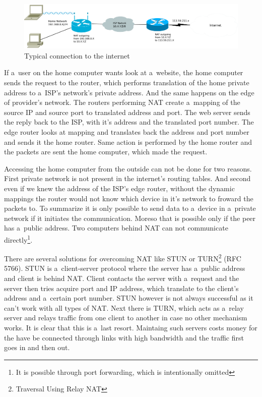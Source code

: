 \begin{figure}[ht]
	\begin{center}
	\includegraphics[width=15cm]{fig/nat-diagram.pdf}
	\caption{Typical connection to the internet}
	\label{fig:nat-diagram}
\end{center}
\end{figure}

If a~user on the home computer wants look at a~website, the home computer sends the request to the router, which performs translation of the home private address to a~ISP's network's private address. And the same happens on the edge of provider's network. The routers performing NAT create a~mapping of the source IP and source port to translated address and port. The web server sends the reply back to the ISP, with it's address and the translated port number. The edge router looks at mapping and translates back the address and port number and sends it the home router. Same action is performed by the home router and the packets are sent the home computer, which made the request. 

Accessing the home computer from the outside can not be done for two reasons. First private network is not present in the internet's routing tables. And second even if we knew the address of the ISP's edge router, without the dynamic mappings the router would not know which device in it's network to froward the packets to. To summarize it is only possible to send data to a~device in a~private network if it initiates the communication. Moreso that is possible only if the peer has a~public address. Two computers behind NAT can not communicate directly\footnote{It is possible through port forwarding, which is intentionally omitted}.  

There are several solutions for overcoming NAT like STUN or TURN\footnote{Traversal Using Relay NAT} (RFC 5766). STUN is a~client-server protocol where the server has a~public address and client is behind NAT. Client contacts the server with a~request and the server then tries acquire port and IP address, which translate to the client's address and a~certain port number. STUN however is not always successful as it can't work with all types of NAT. Next there is TURN, which acts as a~relay server and relays traffic from one client to another in case no other mechanism works. It is clear that this is a~last resort. Maintaing such servers costs money for the have be connected through links with high bandwidth and the traffic first goes in and then out.


